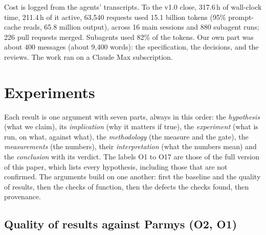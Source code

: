 \documentclass[conference]{IEEEtran}
\begin{document}
Cost is logged from the agents' transcripts. To the v1.0 close, 317.6\,h of wall-clock time, 211.4\,h of it active, 63,540 requests used 15.1 billion tokens (95\% prompt-cache reads, 65.8 million output), across 16 main sessions and 880 subagent runs; 226 pull requests merged. Subagents used 82\% of the tokens. Our own part was about 400 messages (about 9,400 words): the specification, the decisions, and the reviews. The work ran on a Claude Max subscription.

\section{Experiments}
\label{sec:results}


Each result is one argument with seven parts, always in this order: the \emph{hypothesis} (what we claim), its \emph{implication} (why it matters if true), the \emph{experiment} (what is run, on what, against what), the \emph{methodology} (the measure and the gate), the \emph{measurements} (the numbers), their \emph{interpretation} (what the numbers mean) and the \emph{conclusion} with its verdict. The labels O1 to O17 are those of the full version of this paper, which lists every hypothesis, including those that are not confirmed. The arguments build on one another: first the baseline and the quality of results, then the checks of function, then the defects the checks found, then provenance.

\subsection{Quality of results against Parmys (O2, O1)}
\label{sec:q-qor}
\end{document}
